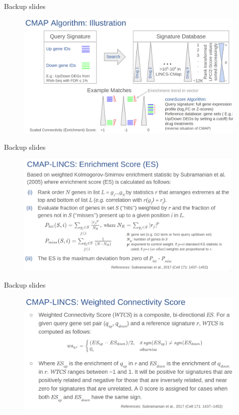 \documentclass[10pt]{beamer}
\begin{document}
\begin{frame}[fragile]{Backup slides}
    \begin{figure}
        \includegraphics[width=12cm]{demo/images/cmap_algo_illu.png}
    \end{figure}
\end{frame}
\begin{frame}[fragile]{Backup slides}
    \begin{figure}
        \includegraphics[width=11cm]{demo/images/cmap_lincs_algo.png}
    \end{figure}
\end{frame}
\begin{frame}[fragile]{Backup slides}
    \begin{figure}
        \includegraphics[width=12cm]{demo/images/cmap_lincs_wtcs.png}
    \end{figure}
\end{frame}
\end{document}
